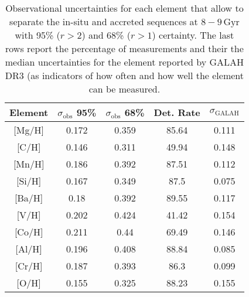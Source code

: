\begin{table}
    \centering
    \caption{Observational uncertainties for each element that allow to separate the in-situ and accreted sequences at $8-9\,\mathrm{Gyr}$ with 95\% ($r>2$) and 68\% ($r>1$) certainty. The last rows report the percentage of measurements and their the median uncertainties for the element reported by GALAH DR3 (as indicators of how often and how well the element can be measured.}
    \begin{tabular}{ccccc}
    \hline
    Element & $\sigma_\text{obs}$ 95\% & $\sigma_\text{obs}$ 68\% & Det. Rate & $\sigma_\text{GALAH}$ \\
    \hline \hline
    {[Mg/H]}  & 0.172 & 0.359 & 85.64 & 0.111 \\
    {[C/H]}  & 0.146 & 0.311 & 49.94 & 0.148 \\
    {[Mn/H]}  & 0.186 & 0.392 & 87.51 & 0.112 \\
    {[Si/H]}  & 0.167 & 0.349 & 87.5 & 0.075 \\
    {[Ba/H]}  & 0.18 & 0.392 & 89.55 & 0.117 \\
    {[V/H]}  & 0.202 & 0.424 & 41.42 & 0.154 \\
    {[Co/H]}  & 0.211 & 0.44 & 69.49 & 0.146 \\
    {[Al/H]}  & 0.196 & 0.408 & 88.84 & 0.085 \\
    {[Cr/H]}  & 0.187 & 0.393 & 86.3 & 0.099 \\
    {[O/H]}  & 0.155 & 0.325 & 88.23 & 0.155 \\
    \hline
    \end{tabular}
    \label{tab:r_values_simulation}
\end{table}
